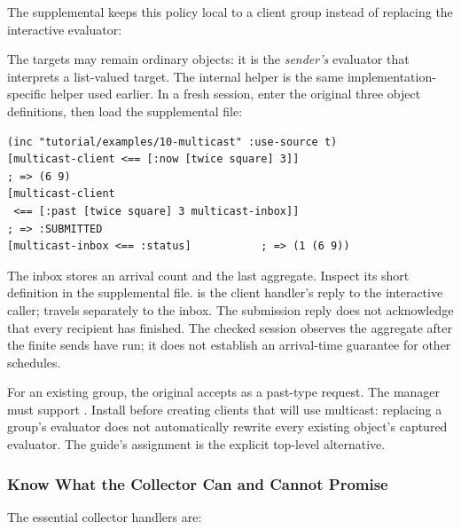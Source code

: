 The supplemental 
keeps this policy local to a client group instead of replacing the
interactive evaluator:


The targets may remain ordinary objects: it is the \emph{sender's}
evaluator that interprets a list-valued target. The internal
 helper is the same implementation-specific
helper used earlier. In a fresh session, enter the original three object
definitions, then load the supplemental file:

\begin{codeblock}
\begin{lstlisting}
(inc "tutorial/examples/10-multicast" :use-source t)
[multicast-client <== [:now [twice square] 3]]
; => (6 9)
[multicast-client
 <== [:past [twice square] 3 multicast-inbox]]
; => :SUBMITTED
[multicast-inbox <== :status]           ; => (1 (6 9))
\end{lstlisting}
\end{codeblock}

The inbox stores an arrival count and the last aggregate. Inspect its
short definition in the supplemental file.  is the
client handler's reply to the interactive caller;  travels
separately to the inbox. The submission reply does not acknowledge that
every recipient has finished. The checked session observes the aggregate
after the finite sends have run; it does not establish an arrival-time
guarantee for other schedules.

For an existing group, the original  accepts
 as a past-type request. The manager must
support . Install before creating clients that
will use multicast: replacing a group's evaluator does not automatically
rewrite every existing object's captured evaluator. The guide's
 assignment is the explicit top-level alternative.

\subsubsection{Know What the Collector Can and Cannot Promise}

The essential collector handlers are:


